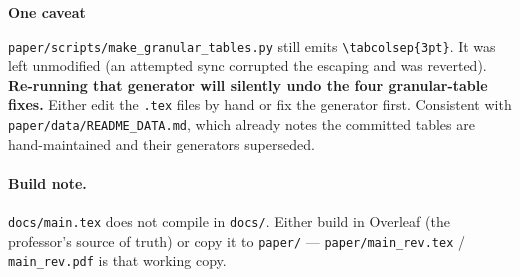 \documentclass[11pt,a4paper]{article}
\newenvironment{callout}[1]
  {\par\medskip\noindent\begin{lrbox}{\calloutbox}%
   \begin{minipage}{\dimexpr\linewidth-20pt\relax}%
   \textbf{#1}\par\smallskip}
  {\end{minipage}\end{lrbox}%
   \setlength{\fboxsep}{10pt}%
   \colorbox{boxgrey}{\usebox{\calloutbox}}\par\medskip}
\begin{document}
\begin{callout}{\textcolor{warnred}{One caveat}}
\texttt{paper/scripts/make\_granular\_tables.py} still emits \verb|\tabcolsep{3pt}|. It was left
unmodified (an attempted sync corrupted the escaping and was reverted). \textbf{Re-running that
generator will silently undo the four granular-table fixes.} Either edit the \texttt{.tex} files by
hand or fix the generator first. Consistent with \texttt{paper/data/README\_DATA.md}, which already
notes the committed tables are hand-maintained and their generators superseded.
\end{callout}

\paragraph{Build note.} \texttt{docs/main.tex} does not compile in \texttt{docs/}. Either build in
Overleaf (the professor's source of truth) or copy it to \texttt{paper/} ---
\texttt{paper/main\_rev.tex} / \texttt{main\_rev.pdf} is that working copy.
\end{document}

